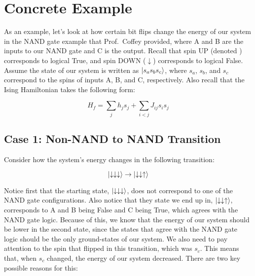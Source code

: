 \documentclass[]{article}
\newcommand{\sd}{\ensuremath{\downarrow}}
\newcommand{\trans}{\ensuremath{\rightarrow}} \def\tightlist{}
\begin{document}
\section{Concrete Example}\label{concrete-example}

As an example, let's look at how certain bit flips change the energy of
our system in the NAND gate example that Prof.~Coffey provided, where A
and B are the inputs to our NAND gate and C is the output. Recall that
spin UP (denoted \su) corresponds to logical True, and spin DOWN (\sd)
corresponds to logical False. Assume the state of our system is written
as \(\ket{s_a s_b s_c}\), where \(s_a\), \(s_b\), and \(s_c\) correspond
to the spins of inputs A, B, and C, respectively. Also recall that the
Ising Hamiltonian takes the following form:

\[H_f = \sum_j h_j s_j + \sum_{i < j} J_{ij} s_i s_j\]

\subsection{Case 1: Non-NAND to NAND
Transition}\label{case-1-non-nand-to-nand-transition}

Consider how the system's energy changes in the following transition:

\[\ket{\sd\sd\sd} \trans \ket{\sd\sd\su}\]

Notice first that the starting state, \(\ket{\sd\sd\sd}\), does not
correspond to one of the NAND gate configurations. Also notice that they
state we end up in, \(\ket{\sd\sd\su}\), corresponds to A and B being
False and C being True, which agrees with the NAND gate logic. Because
of this, we know that the energy of our system should be lower in the
second state, since the states that agree with the NAND gate logic
should be the only ground-states of our system. We also need to pay
attention to the spin that flipped in this transition, which was
\(s_c\). This means that, when \(s_c\) changed, the energy of our system
decreased. There are two key possible reasons for this:
\end{document}
